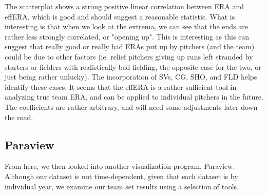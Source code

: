 \documentclass[12pt]{article}
\numberwithin{equation}{subsection}
\begin{document}
The scatterplot shows a strong positive linear correlation between ERA and effERA, which is good and should suggest a reasonable statistic. What is interesting is that when we look at the extrema, we can see that the ends are rather less strongly correlated, or "opening up". This is interesting as this can suggest that really good or really bad ERAs put up by pitchers (and the team) could be due to other factors (ie. relief pitchers giving up runs left stranded by starters or fielders with realistically bad fielding, the opposite case for the two, or just being rather unlucky). The incorporation of SVs, CG, SHO, and FLD helps identify these cases. It seems that the effERA is a rather sufficient tool in analyzing true team ERA, and can be applied to individual pitchers in the future. The coefficients are rather arbitrary, and will need some adjustments later down the road.

\subsection{Paraview} %

From here, we then looked into another visualization program, Paraview. Although our dataset is not time-dependent, given that each dataset is by individual year, we examine our team set results using a selection of tools.
\end{document}
